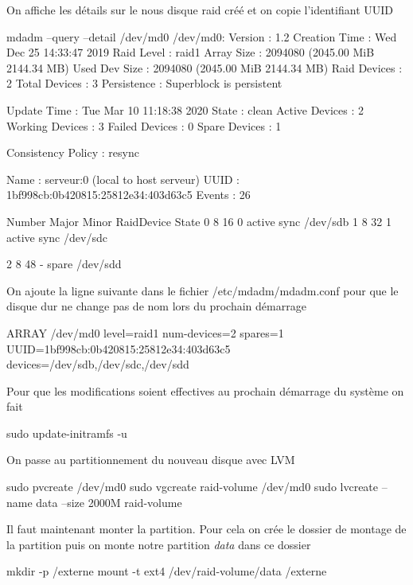 \documentclass[a4paper,12pt,french]{report} %
\begin{document}
On affiche les détails sur le nous disque raid créé et on copie l'identifiant UUID
\begin{exempleConsole}
mdadm --query --detail /dev/md0
/dev/md0:
           Version : 1.2
     Creation Time : Wed Dec 25 14:33:47 2019
        Raid Level : raid1
        Array Size : 2094080 (2045.00 MiB 2144.34 MB)
     Used Dev Size : 2094080 (2045.00 MiB 2144.34 MB)
      Raid Devices : 2
     Total Devices : 3
       Persistence : Superblock is persistent

       Update Time : Tue Mar 10 11:18:38 2020
             State : clean
    Active Devices : 2
   Working Devices : 3
    Failed Devices : 0
     Spare Devices : 1

Consistency Policy : resync

              Name : serveur:0  (local to host serveur)
              UUID : 1bf998cb:0b420815:25812e34:403d63c5
            Events : 26

    Number   Major   Minor   RaidDevice State
       0       8       16        0      active sync   /dev/sdb
       1       8       32        1      active sync   /dev/sdc

       2       8       48        -      spare   /dev/sdd

\end{exempleConsole}

On ajoute la ligne suivante dans le fichier /etc/mdadm/mdadm.conf pour que le disque dur ne change pas de nom lors du prochain démarrage
\begin{exempleConsole}
ARRAY /dev/md0 level=raid1 num-devices=2 spares=1 UUID=1bf998cb:0b420815:25812e34:403d63c5 devices=/dev/sdb,/dev/sdc,/dev/sdd
\end{exempleConsole}

Pour que les modifications soient effectives au prochain démarrage du système on fait 
\begin{exempleConsole}
sudo update-initramfs -u
\end{exempleConsole}

On passe au partitionnement du nouveau disque avec LVM
\begin{exempleConsole}
sudo pvcreate /dev/md0
sudo vgcreate raid-volume /dev/md0 
sudo lvcreate --name data --size 2000M raid-volume
\end{exempleConsole}
Il faut maintenant monter la partition. Pour cela on crée le dossier de montage de la partition puis on monte notre partition \emph{data} dans ce dossier 
\begin{exempleConsole}
mkdir -p /externe
mount -t ext4 /dev/raid-volume/data /externe
\end{exempleConsole}
\end{document}
